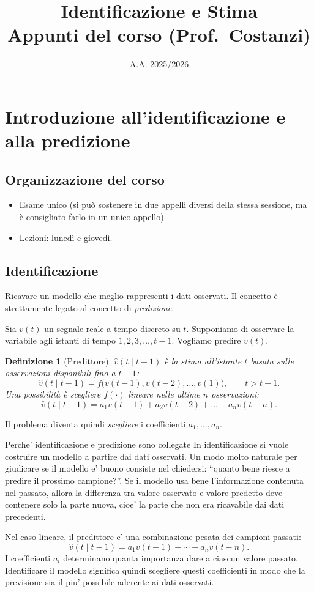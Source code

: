 \documentclass[11pt,a4paper]{article}
\title{Identificazione e Stima \\ \large Appunti del corso (Prof.\ Costanzi)}
\author{}
\date{A.A. 2025/2026}
\newtheorem{definition}{Definizione}
\begin{document}
\maketitle
\tableofcontents
\newpage

\section{Introduzione all'identificazione e alla predizione}
\subsection*{Organizzazione del corso}
\begin{itemize}
  \item Esame unico (si può sostenere in due appelli diversi della stessa sessione, ma è consigliato farlo in un unico appello).
  \item Lezioni: lunedì e giovedì.
\end{itemize}

\subsection{Identificazione}
Ricavare un modello che meglio rappresenti i dati osservati. Il concetto è strettamente legato al concetto di \emph{predizione}.

Sia $v(t)$ un segnale reale a tempo discreto su $t$. Supponiamo di osservare la variabile agli istanti di tempo $1,2,3,\dots,t-1$. Vogliamo predire $v(t)$.

\begin{definition}[Predittore]
$\hat v(t\mid t-1)$ è la stima all'istante $t$ basata sulle osservazioni disponibili fino a $t-1$:
\[
\hat v(t\mid t-1)=f\bigl(v(t-1),v(t-2),\dots,v(1)\bigr),\qquad t>t-1.
\]
Una possibilità è scegliere $f(\cdot)$ lineare nelle ultime $n$ osservazioni:
\[
\hat v(t\mid t-1)=a_1 v(t-1)+a_2 v(t-2)+\dots+a_n v(t-n).
\]
\end{definition}

Il problema diventa quindi \emph{scegliere} i coefficienti $a_1,\dots,a_n$.

\begin{spiegazione}{Perche' identificazione e predizione sono collegate}
In identificazione si vuole costruire un modello a partire dai dati osservati. Un modo molto naturale per giudicare se il modello e' buono consiste nel chiedersi: ``quanto bene riesce a predire il prossimo campione?''. Se il modello usa bene l'informazione contenuta nel passato, allora la differenza tra valore osservato e valore predetto deve contenere solo la parte nuova, cioe' la parte che non era ricavabile dai dati precedenti.

Nel caso lineare, il predittore e' una combinazione pesata dei campioni passati:
\[
\hat v(t\mid t-1)=a_1v(t-1)+\cdots+a_nv(t-n).
\]
I coefficienti $a_i$ determinano quanta importanza dare a ciascun valore passato. Identificare il modello significa quindi scegliere questi coefficienti in modo che la previsione sia il piu' possibile aderente ai dati osservati.
\end{spiegazione}
\end{document}
